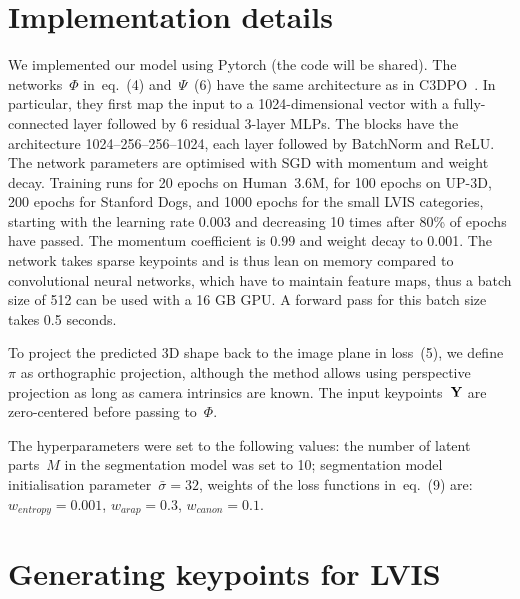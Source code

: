 \section{Implementation details}

We implemented our model using Pytorch (the code will be shared).
The networks~$\Phi$ in~eq.~(4) and~$\Psi$~(6) have the same architecture as in C3DPO~\cite{Novotny2019}.
In particular, they first map the input to a 1024-dimensional vector with a fully-connected layer followed by 6 residual 3-layer MLPs.
The blocks have the architecture 1024--256--256--1024, each layer followed by BatchNorm and ReLU.
The network parameters are optimised with SGD with momentum and weight decay.
Training runs for 20 epochs on Human~3.6M, for 100 epochs on UP-3D, 200 epochs for Stanford Dogs, and 1000 epochs for the small LVIS categories, starting with the learning rate 0.003 and decreasing 10 times after 80\% of epochs have passed.
The momentum coefficient is 0.99 and weight decay to 0.001.
The network takes sparse keypoints and is thus lean on memory compared to convolutional neural networks, which have to maintain feature maps,
thus a batch size of 512 can be used with a 16 GB GPU.
A forward pass for this batch size takes 0.5 seconds.

To project the predicted 3D shape back to the image plane in loss~(5), we define~$\pi$ as orthographic projection,
although the method allows using perspective projection as long as camera intrinsics are known.
The input keypoints~$\mathbf{Y}$ are zero-centered before passing to~$\Phi$.

The hyperparameters were set to the following values:
the number of latent parts~$M$ in the segmentation model was set to 10;
segmentation model initialisation parameter~$\bar{\sigma} = 32$,
weights of the loss functions in~eq.~(9) are:
$w_{entropy} = 0.001$,
$w_{arap} = 0.3$,
$w_{canon} = 0.1$.

\section{Generating keypoints for LVIS}

